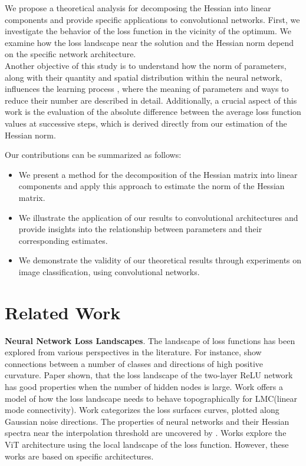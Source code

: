 \documentclass[conference]{IEEEtran}
\begin{document}
We propose a theoretical analysis for decomposing the Hessian into linear components and provide specific applications to convolutional networks.
First, we investigate the behavior of the loss function in the vicinity of the optimum. We examine how the loss landscape near the solution and the Hessian norm depend on the specific network architecture. \\
Another objective of this study is to understand how the norm of parameters, along with their quantity and spatial distribution within the neural network, influences the learning process \cite{azadbakht2022drasticallyreducingnumbertrainable, wu2019prodsumnetreducingmodelparameters, kahatapitiya2020exploitingredundancyconvolutionalfilters}, where the meaning of parameters and ways to reduce their number are described in detail.
Additionally, a crucial aspect of this work is the evaluation of the absolute difference between the average loss function values at successive steps, which is derived directly from our estimation of the Hessian norm.

Our contributions can be summarized as follows:
\begin{itemize}
    \item We present a method for the decomposition of the Hessian matrix into linear components and apply this approach to estimate the norm of the Hessian matrix.
    \item We illustrate the application of our results to convolutional architectures and provide insights into the relationship between parameters and their corresponding estimates.
    \item We demonstrate the validity of our theoretical results through experiments on image classification, using convolutional networks.
\end{itemize}


\section{Related Work}\label{sec:rw}

\textbf{Neural Network Loss Landscapes}.
The landscape of loss functions has been explored from various perspectives in the literature. For instance,\cite{DBLP:journals/corr/abs-1910-05929} show connections between a number of classes and directions of high positive curvature. Paper \cite{skip-conn-landscape} shown, that the loss landscape of the two-layer
ReLU network has good properties when the number of hidden nodes is large.
Work \cite{singh2024landscapinglinearmodeconnectivity} offers a model of how the loss landscape needs to behave topographically for LMC(linear mode connectivity). Work \cite{categ_plots} categorizes the loss
surfaces curves, plotted along Gaussian noise directions. The properties of neural networks and their Hessian spectra near the interpolation threshold are uncovered by \cite{singh2022phenomenologydoubledescentfinitewidth}.
Works \cite{lee2024visualizinglosslandscapeselfsupervised, chen2022visiontransformersoutperformresnets} explore the ViT architecture using the local landscape of the loss function.
However, these works are based on specific architectures. %
\end{document}
